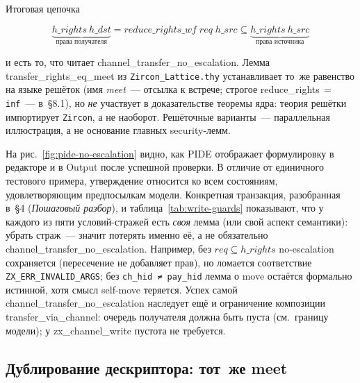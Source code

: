 \documentclass[11pt,a4paper]{article}
\newcommand{\isabel}[1]{{\isabelleit #1}}
\newcommand{\lemmaname}[1]{\isabel{#1}}
\begin{document}
Итоговая цепочка

\[
	\underbrace{h\_rights\ h\_\mathit{dst}}_{\text{права получателя}}
	= \mathit{reduce\_rights\_wf}\;\mathit{req}\;h\_\mathit{src}
	\subseteq
	\underbrace{h\_rights\ h\_\mathit{src}}_{\text{права источника}}
\]

и есть то, что читает
\lemmaname{channel\_transfer\_no\_escalation}. Лемма
\lemmaname{transfer\_rights\_eq\_meet} из \texttt{Zircon\_Lattice.thy}
устанавливает то~же равенство на языке решёток (имя
\emph{meet}~--- отсылка к встрече; строгое
\lemmaname{reduce\_rights}$\,=\,$\texttt{inf}~--- в~§8.1), но
\emph{не} участвует в доказательстве теоремы ядра: теория решётки
импортирует \texttt{Zircon}, а не наоборот. Решёточные варианты~---
параллельная иллюстрация, а не основание главных security-лемм.

На рис.~\ref{fig:pide-no-escalation} видно, как PIDE отображает
формулировку в редакторе и в Output после успешной проверки. В отличие
от единичного тестового примера, утверждение относится ко всем
состояниям, удовлетворяющим предпосылкам модели.
Конкретная транзакция, разобранная в~§4 (\emph{Пошаговый разбор}), и
таблица~\ref{tab:write-guards} показывают, что у каждого из пяти
условий-стражей есть \emph{своя} лемма (или свой аспект семантики):
убрать страж~--- значит потерять именно её, а не обязательно
\lemmaname{channel\_transfer\_no\_escalation}. Например, без
$\mathit{req}\subseteq h\_rights$ no-escalation сохраняется
(пересечение не добавляет прав), но ломается соответствие
\texttt{ZX\_ERR\_INVALID\_ARGS}; без
\texttt{ch\_hid ≠ pay\_hid} лемма о move остаётся формально истинной,
хотя смысл self-move теряется. Успех самой
\lemmaname{channel\_transfer\_no\_escalation} наследует ещё и
ограничение композиции \lemmaname{transfer\_via\_channel}: очередь
получателя должна быть пуста (см.\ границу модели); у
\lemmaname{zx\_channel\_write} пустота не требуется.

\subsection{Дублирование дескриптора: тот~же meet}
\end{document}
